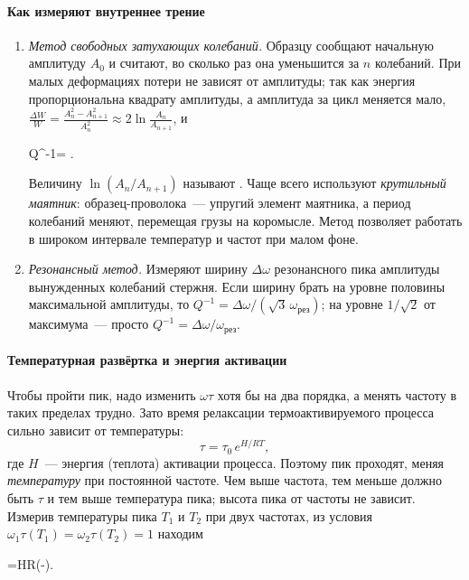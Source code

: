 \paragraph{Как измеряют внутреннее трение}
\begin{enumerate}
\item \emph{Метод свободных затухающих колебаний.} Образцу сообщают
начальную амплитуду $A_0$ и считают, во сколько раз она уменьшится за $n$
колебаний. При малых деформациях потери не зависят от амплитуды; так как
энергия пропорциональна квадрату амплитуды, а амплитуда за цикл меняется
мало,
$\frac{\Delta W}{W}=\frac{A_n^2-A_{n+1}^2}{A_n^2}\approx2\ln\frac{A_n}{A_{n+1}}$,
и
\begin{keyeq}\label{eq:Q-decrement}
Q^{-1}\approx{}\pi\ln{}=\ln{} .
\end{keyeq}
Величину $\ln(A_n/A_{n+1})$ называют .
Чаще всего используют \emph{крутильный маятник}: образец-проволока~—
упругий элемент маятника, а период колебаний меняют, перемещая грузы на
коромысле. Метод позволяет работать в широком интервале температур и
частот при малом фоне.
\item \emph{Резонансный метод.} Измеряют ширину $\Delta\omega$ резонансного
пика амплитуды вынужденных колебаний стержня. Если ширину брать на уровне
половины максимальной амплитуды, то $Q^{-1}=\Delta\omega/(\sqrt3\,\omega_\text{рез})$;
на уровне $1/\sqrt2$ от максимума~— просто $Q^{-1}=\Delta\omega/\omega_\text{рез}$.
\end{enumerate}

\paragraph{Температурная развёртка и энергия активации}
Чтобы пройти пик, надо изменить $\omega\tau$ хотя бы на два порядка, а
менять частоту в таких пределах трудно. Зато время релаксации
термоактивируемого процесса сильно зависит от температуры:
\begin{equation}\label{eq:tau-T}
\tau=\tau_0\,e^{H/RT},
\end{equation}
где $H$~— энергия (теплота) активации процесса. Поэтому пик проходят,
меняя \emph{температуру} при постоянной частоте. Чем выше частота, тем
меньше должно быть $\tau$ и тем выше температура пика; высота пика от
частоты не зависит. Измерив температуры пика $T_1$ и $T_2$ при двух
частотах, из условия $\omega_1\tau(T_1)=\omega_2\tau(T_2)=1$ находим
\begin{keyeq}\label{eq:H-two-freq}
\ln{}=\frac HR\left(-\right).
\end{keyeq}

